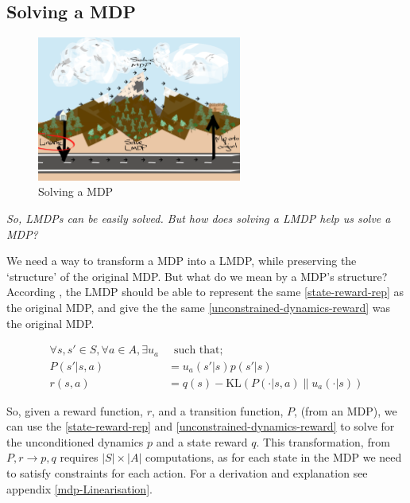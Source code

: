 \subsection{Solving a MDP}\label{construct-lmdp-from-mdp}

\begin{figure}[h!]
\centering
\includegraphics[width=0.6\textwidth,height=0.3\textheight]{../../pictures/drawings/abstract-representations-linear.png}
\caption{Solving a MDP}
\end{figure}

\begin{displayquote}
\textsl{So, LMDPs can be easily solved. But how does solving a LMDP help us solve a MDP?}
\end{displayquote}

We need a way to transform a MDP into a LMDP, while preserving the
`structure' of the original MDP. But what do we mean by a MDP's structure?
According \cite{Todorov2009}, the LMDP should be able to represent the same \ref{state-reward-rep} as the original MDP,
and give the the same \ref{unconstrained-dynamics-reward} was the original MDP.

\begin{align*}
\forall s, s' \in S, \forall a \in A, \exists u_a& \;\;\text{such that;} \\
P(s' | s, a) &= u_a(s'|s)p(s'|s) \tag{transition dynamics} \label{state-reward-rep} \\
r(s, a) &= q(s) - \text{KL}(P(\cdot | s, a) \parallel u_a(\cdot| s) ) \label{unconstrained-dynamics-reward} \tag{rewards}
\end{align*}


So, given a reward function, $r$, and a transition function, $P$,
(from an MDP), we can use the \ref{state-reward-rep} and \ref{unconstrained-dynamics-reward}
to solve for the unconditioned dynamics $p$ and a state reward $q$.
This transformation, from $P, r \to p, q$ requires $|S| \times |A|$ computations, as for each state in the
MDP we need to satisfy constraints for each action. For a derivation and explanation see appendix \ref{mdp-Linearisation}.

